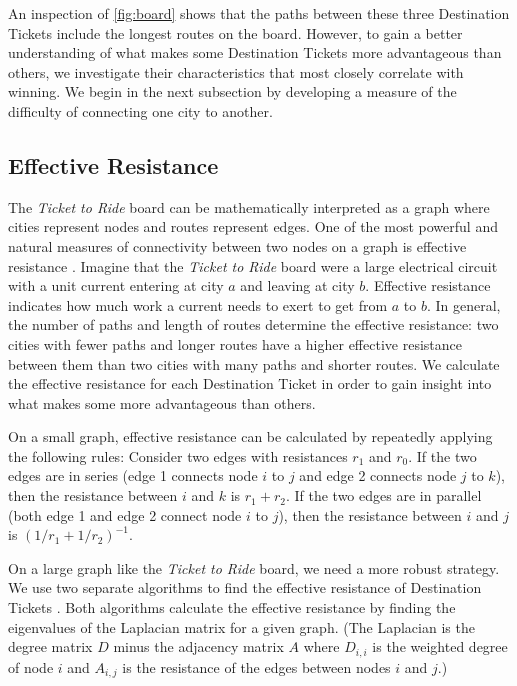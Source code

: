 An inspection of \cref{fig:board} shows that the paths between 
these three Destination Tickets include the longest routes
on the board.
However, to gain a better understanding of what makes some
Destination Tickets more advantageous than others,
we investigate their characteristics
that most closely correlate with winning.
We begin in the next subsection by developing a measure
of the difficulty of connecting one city to another.

\subsection{Effective Resistance}
The \textit{Ticket to Ride} board can be mathematically
interpreted as a graph where cities represent
nodes and routes represent edges.
One of the most powerful and natural measures of connectivity
between two nodes on a graph is effective resistance
\cite{ellens2011effective}.
Imagine that the \textit{Ticket to Ride} board were
a large electrical circuit with a unit current
entering at city $a$ and leaving at city $b$.
Effective resistance indicates
how much work a current needs to exert
to get from $a$ to $b$.
In general, the number of paths and length of routes 
determine the effective resistance:
two cities with fewer paths and longer routes
have a higher effective resistance between them
than two cities with many paths and shorter routes.
We calculate the effective resistance for each 
Destination Ticket in order to gain insight
into what makes some more advantageous than others.

On a small graph, effective resistance can be calculated
by repeatedly applying the following rules:
Consider two edges with resistances $r_1$ and $r_0$.
If the two edges are in series (edge 1 connects node $i$ to $j$
and edge 2 connects node $j$ to $k$), then the resistance between
$i$ and $k$ is $r_1 + r_2$.
If the two edges are in parallel (both edge 1 and edge 2 connect
node $i$ to $j$), then the resistance between $i$ and $j$
is $(1/r_1 + 1/r_2)^{-1}$.

On a large graph like the \textit{Ticket to Ride} board, 
we need a more robust strategy.
We use two separate algorithms to find the effective resistance
of Destination Tickets
\cite{ellens2011effective, wu2004theory}.
Both algorithms calculate the effective resistance by finding 
the eigenvalues of the Laplacian matrix for a given graph.
(The Laplacian is the degree matrix $D$ minus the adjacency
matrix $A$ where $D_{i,i}$ is the weighted degree of node $i$
and $A_{i,j}$ is the resistance of the edges between nodes
$i$ and $j$.)

